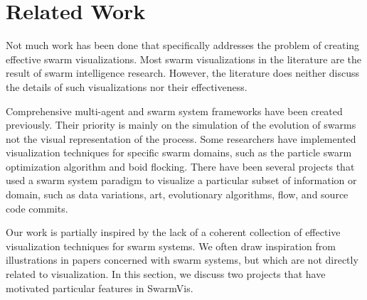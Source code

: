 \documentclass[conference]{IEEEtran}
\begin{document}
\section{Related Work}
Not much work has been done that specifically addresses the problem of creating effective swarm visualizations.
Most swarm visualizations in the literature are the result of swarm intelligence research. However, the literature does neither discuss the details of such visualizations nor their effectiveness. 

Comprehensive multi-agent and swarm system frameworks\cite{Luke}\cite{860347} have been created previously. Their priority is mainly on the simulation of the evolution of swarms not the visual representation of the process.
Some researchers have implemented visualization techniques for specific swarm domains,
such as the particle swarm optimization algorithm\cite{Secrest} and boid flocking\cite{reynolds1987}.
There have been several projects that used a swarm system paradigm to visualize a particular subset of information or domain, such as data variations\cite{1382896}, art\cite{Boyd}, evolutionary algorithms\cite{spector2005ecb}\cite{Spector02evolutionarydynamics},
flow\cite{10.1109/TVCG.2005.87}\cite{Merzkirch}, and source code commits\cite{codeswarm:website}.

Our work is partially inspired by the lack of a coherent collection of effective visualization techniques for swarm systems. We often draw inspiration from illustrations in papers concerned with swarm systems, but which are not directly related to visualization. In this section, we discuss two projects that have motivated particular features in SwarmVis.
\end{document}
